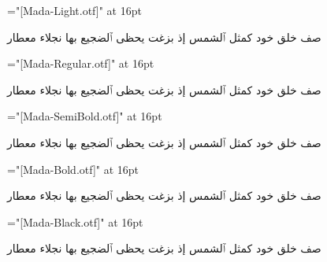 \nopagenumbers
{}
\def\sample#1{%
  \font\test="[Mada-#1.otf]" at 16pt%
  \centerline{%
    \beginR%
    \test%
    صف خلق خود كمثل ٱلشمس إذ بزغت يحظى ٱلضجيع بها نجلاء معطار%
    \endR%
  }%
}

\sample{Light}
\sample{Regular}
\sample{SemiBold}
\sample{Bold}
\sample{Black}
\bye

